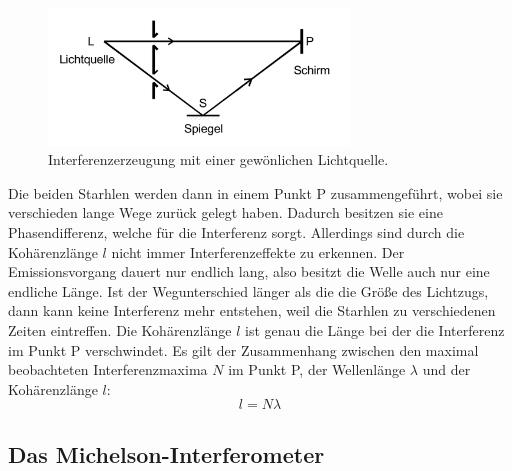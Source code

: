 \begin{figure}
    \centering
    \includegraphics[width=8cm]{data/abb1.png}
    \caption{Interferenzerzeugung mit einer gewönlichen Lichtquelle.}
    \label{fig:abb1}
\end{figure}
\FloatBarrier
Die beiden Starhlen werden dann in einem Punkt P zusammengeführt, wobei sie verschieden lange Wege zurück gelegt haben.
Dadurch besitzen sie eine Phasendifferenz, welche für die Interferenz sorgt.
Allerdings sind durch die Kohärenzlänge $l$ nicht immer Interferenzeffekte zu erkennen.
Der Emissionsvorgang dauert nur endlich lang, also besitzt die Welle auch nur eine endliche Länge.
Ist der Wegunterschied länger als die die Größe des Lichtzugs, dann kann keine Interferenz mehr entstehen, weil die Starhlen zu verschiedenen Zeiten eintreffen.
Die Kohärenzlänge $l$ ist genau die Länge bei der die Interferenz im Punkt P verschwindet.
Es gilt der Zusammenhang zwischen den maximal beobachteten Interferenzmaxima $N$ im Punkt P, der Wellenlänge $\lambda$ und der Kohärenzlänge $l$:
\begin{equation}
    l = N \lambda
\end{equation}

\subsection{Das Michelson-Interferometer}
\label{sec:theo2}

